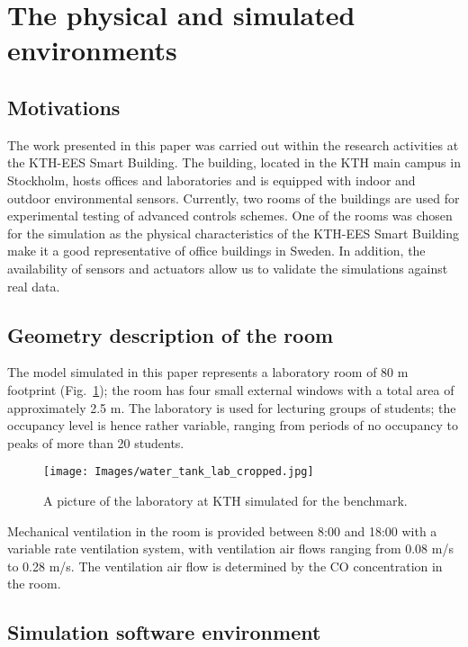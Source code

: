 \documentclass{article}
\begin{document}
\section{The physical and simulated environments}
\subsection{Motivations}
The work presented in this paper was carried out within the research activities
at the KTH-EES Smart Building. The building, located in the KTH main campus in
Stockholm, hosts offices and laboratories and is equipped with indoor and
outdoor environmental sensors. Currently, two rooms of the buildings are used
for experimental testing of advanced controls schemes. One of the rooms was
chosen for the simulation as the physical characteristics of the KTH-EES Smart
Building make it a good representative of office buildings in Sweden. In
addition, the availability of sensors and actuators allow us to validate the
simulations against real data.



\subsection{Geometry description of the room}

The model simulated in this paper represents a laboratory room of 80 m
footprint (Fig.~\ref{fig:testebd_pic}); the room has four small external
windows with a total area of approximately 2.5 m. The laboratory is used
for lecturing groups of students; the occupancy level is hence rather variable,
ranging from periods of no occupancy to peaks of more than 20 students.

\begin{figure}[htb]
\centering
\texttt{[image: Images/water\_tank\_lab\_cropped.jpg]}
\caption{A picture of the laboratory at KTH simulated for the benchmark.}
\label{fig:testebd_pic}
\end{figure}

Mechanical ventilation in the room is provided between 8:00 and 18:00 with a variable rate ventilation system, with
ventilation air flows ranging from 0.08 m/s to 0.28 m/s.
The ventilation air flow is determined by the CO concentration in the room.

\subsection{Simulation software environment}
\end{document}
